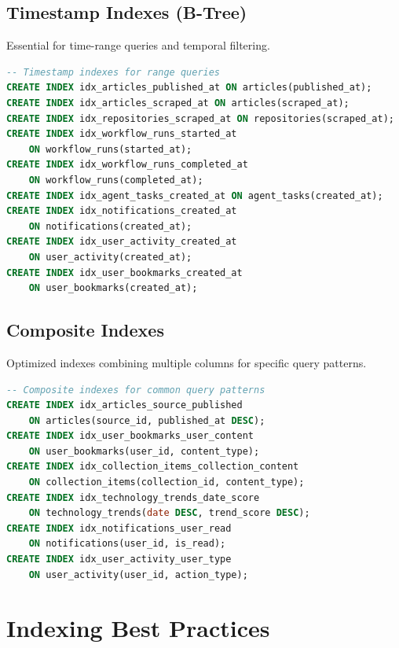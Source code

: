 \documentclass[12pt,a4paper]{report}
\begin{document}
\subsection{Timestamp Indexes (B-Tree)}

Essential for time-range queries and temporal filtering.

\begin{lstlisting}[language=SQL,basicstyle=\ttfamily\small]
-- Timestamp indexes for range queries
CREATE INDEX idx_articles_published_at ON articles(published_at);
CREATE INDEX idx_articles_scraped_at ON articles(scraped_at);
CREATE INDEX idx_repositories_scraped_at ON repositories(scraped_at);
CREATE INDEX idx_workflow_runs_started_at 
    ON workflow_runs(started_at);
CREATE INDEX idx_workflow_runs_completed_at 
    ON workflow_runs(completed_at);
CREATE INDEX idx_agent_tasks_created_at ON agent_tasks(created_at);
CREATE INDEX idx_notifications_created_at 
    ON notifications(created_at);
CREATE INDEX idx_user_activity_created_at 
    ON user_activity(created_at);
CREATE INDEX idx_user_bookmarks_created_at 
    ON user_bookmarks(created_at);
\end{lstlisting}

\subsection{Composite Indexes}

Optimized indexes combining multiple columns for specific query patterns.

\begin{lstlisting}[language=SQL,basicstyle=\ttfamily\small]
-- Composite indexes for common query patterns
CREATE INDEX idx_articles_source_published 
    ON articles(source_id, published_at DESC);
CREATE INDEX idx_user_bookmarks_user_content 
    ON user_bookmarks(user_id, content_type);
CREATE INDEX idx_collection_items_collection_content 
    ON collection_items(collection_id, content_type);
CREATE INDEX idx_technology_trends_date_score 
    ON technology_trends(date DESC, trend_score DESC);
CREATE INDEX idx_notifications_user_read 
    ON notifications(user_id, is_read);
CREATE INDEX idx_user_activity_user_type 
    ON user_activity(user_id, action_type);
\end{lstlisting}

\section{Indexing Best Practices}
\end{document}
